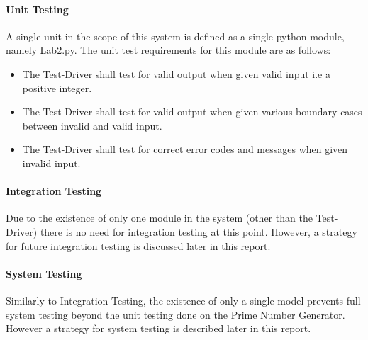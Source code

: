\documentclass[]{article}
\begin{document}
\paragraph{Unit Testing}
A single unit in the scope of this system is defined as a single python module, namely Lab2.py. The unit test requirements for this module are as follows:
\begin{itemize}
	\item  The Test-Driver shall test for valid output when given valid input i.e a positive integer.
	\item  The Test-Driver shall test for valid output when given various boundary cases between invalid and valid input.
	\item  The Test-Driver shall test for correct error codes and messages when given invalid input.
\end{itemize}

\paragraph{Integration Testing}
Due to the existence of only one module in the system (other than the Test-Driver) there is no need for integration testing at this point. However, a strategy for future integration testing is discussed later in this report.

\paragraph{System Testing}
Similarly to Integration Testing, the existence of only a single model prevents full system testing beyond the unit testing done on the Prime Number Generator. However a strategy for system testing is described later in this report.
\end{document}
